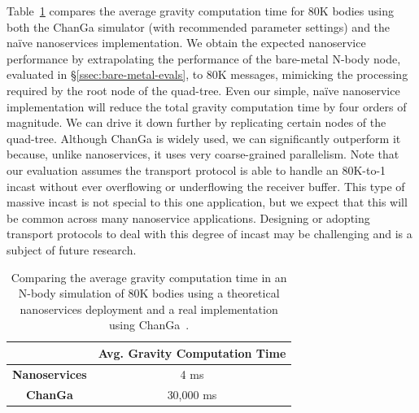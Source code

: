 Table~\ref{tab:nbody-changa} compares the average gravity computation time for 80K bodies using both the ChanGa simulator (with recommended parameter settings) and the na\"ive nanoservices implementation.
We obtain the expected nanoservice performance by extrapolating the performance of the \name{} bare-metal N-body node, evaluated in \S\ref{ssec:bare-metal-evals}, to 80K messages, mimicking the processing required by the root node of the quad-tree.
Even our simple, na\"ive nanoservice implementation will reduce the total gravity computation time by four orders of magnitude. We can drive it down further by replicating certain nodes of the quad-tree.
Although ChanGa is widely used, we can significantly outperform it because, unlike nanoservices, it uses very coarse-grained parallelism. Note that our evaluation assumes the transport protocol is able to handle an 80K-to-1 incast without ever overflowing or underflowing the receiver buffer.
This type of massive incast is not special to this one application, but we expect that this will be common across many nanoservice applications.
Designing or adopting transport protocols to deal with this degree of incast may be challenging and is a subject of future research.

\begin{table}
\begin{center}
\begin{tabular}{c|c}
                      & \textbf{Avg. Gravity Computation Time} \\ \toprule
\textbf{Nanoservices} & 4 ms                                   \\
\textbf{ChanGa}       & 30,000 ms                                 \\
\end{tabular}
\vspace{5pt}
\caption{Comparing the average gravity computation time in an N-body simulation of 80K bodies using a theoretical nanoservices deployment and a real implementation using ChanGa~\cite{changa}.}
\label{tab:nbody-changa}
\end{center}
\end{table}